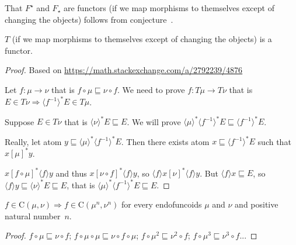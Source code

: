 That $F^{\star}$ and $F_{\star}$ are functors (if we map morphisms to
themselves except of changing the objects) follows from
conjecture~.

\begin{thm}
$T$ (if we map morphisms to
themselves except of changing the objects) is a functor.
\end{thm}

\begin{proof}
  Based on \url{https://math.stackexchange.com/a/2792239/4876}

  Let $f : \mu \rightarrow \nu$ that is $f \circ \mu \sqsubseteq \nu \circ f$.
  We need to prove $f : T \mu \rightarrow T \nu$ that is $E \in T \nu
  \Rightarrow \langle f^{- 1} \rangle^{\ast} E \in T \mu$.

  Suppose $E \in T \nu$ that is $\langle \nu \rangle^{\ast} E \sqsubseteq E$.
  We will prove $\langle \mu \rangle^{\ast} \langle f^{- 1} \rangle^{\ast} E
  \sqsubseteq \langle f^{- 1} \rangle^{\ast} E$.


  Really, let atom $y \sqsubseteq \langle \mu \rangle^{\ast} \langle f^{- 1}
  \rangle^{\ast} E$. Then there exists atom $x \sqsubseteq \langle f^{- 1}
  \rangle^{\ast} E$ such that $x \mathrel{[\mu]^{\ast}} y$.

  $x \mathrel{[f \circ \mu]^{\ast}} \langle f \rangle y$ and thus $x
  \mathrel{[\nu \circ f]^{\ast}} \langle f \rangle y$, so $\langle f \rangle x
  \mathrel{[\nu]^{\ast}} \langle f \rangle y$. But $\langle f \rangle x
  \sqsubseteq E$, so $\langle f \rangle y \sqsubseteq \langle \nu
  \rangle^{\ast} E \sqsubseteq E$, that is $\langle \mu \rangle^{\ast} \langle
  f^{- 1} \rangle^{\ast} E \sqsubseteq E$.
\end{proof}

\begin{prop}
  $f \in \mathrm{C} (\mu, \nu) \Rightarrow f \in \mathrm{C} (\mu^n, \nu^n)$
  for every endofuncoids $\mu$ and $\nu$ and positive natural
  number~$n$.
\end{prop}

\begin{proof}
  $f \circ \mu \sqsubseteq \nu \circ f$; $f \circ \mu \circ \mu \sqsubseteq
  \nu \circ f \circ \mu$; $f \circ \mu^2 \sqsubseteq \nu^2 \circ f$; $f \circ
  \mu^3 \sqsubseteq \nu^3 \circ f$...
\end{proof}

